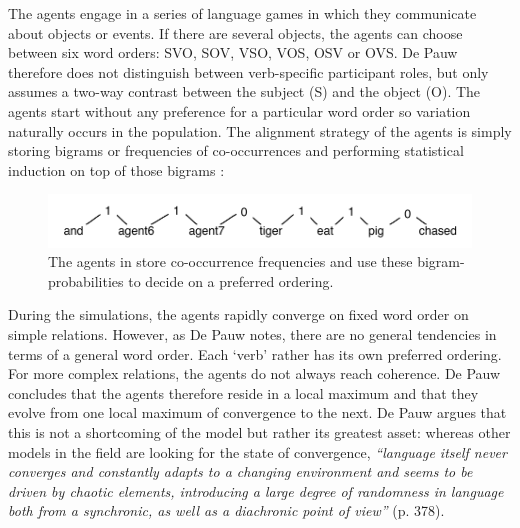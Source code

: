 The agents engage in a series of language games in which they communicate about objects or events. If there are several objects, the agents can choose between six word orders: SVO, SOV, VSO, VOS, OSV or OVS. De Pauw therefore does not distinguish between verb-specific participant roles, but only assumes a two-way contrast between the subject (S) and the object (O). The agents start without any preference for a particular word order so variation naturally occurs in the population. The alignment strategy of the agents is simply storing bigrams or frequencies of co-occurrences and performing statistical induction on top of those bigrams \citep[362]{depauw02grael}:

\begin{figure}[h]
\centerline{\includegraphics[width=\textwidth]{Chapter4/figs/depauw}}
  \caption[Bigram probabilities \citep{depauw02grael}]{The agents in \citet{depauw02grael} store co-occurrence frequencies and use these bigram-probabilities to decide on a preferred ordering.}
   \label{f:depauw}
\end{figure}

During the simulations, the agents rapidly converge on fixed word order on simple relations. However, as De Pauw notes, there are no general tendencies in terms of a general word order. Each `verb' rather has its own preferred ordering. For more complex relations, the agents do not always reach coherence. De Pauw concludes that the agents therefore reside in a local maximum and that they evolve from one local maximum of convergence to the next. De Pauw argues that this is not a shortcoming of the model but rather its greatest asset: whereas other models in the field are looking for the state of convergence, {\em ``language itself never converges and constantly adapts to a changing environment and seems to be driven by chaotic elements, introducing a large degree of randomness in language both from a synchronic, as well as a diachronic point of view''} (p. 378).

